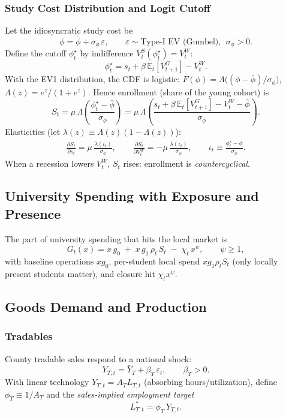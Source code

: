 \subsubsection*{Study Cost Distribution and Logit Cutoff}
Let the idiosyncratic study cost be
\[
\phi=\bar\phi + \sigma_\phi\,\varepsilon,\qquad \varepsilon\sim \text{Type-I EV (Gumbel)},\ \ \sigma_\phi>0.
\]
Define the cutoff $\phi^\star_t$ by indifference $V^S_t(\phi^\star_t)=V^W_t$:
\[
\phi^\star_t=s_t+\beta\,\mathbb{E}_t[V^G_{t+1}]-V^W_t.
\]
With the EV1 distribution, the CDF is logistic: $F(\phi)=\Lambda\big((\phi-\bar\phi)/\sigma_\phi\big)$, $\Lambda(z)=e^z/(1+e^z)$. Hence enrollment (share of the young cohort) is
\begin{equation}
	S_t=\mu\,\Lambda\!\left(\frac{\phi^\star_t-\bar\phi}{\sigma_\phi}\right)=\mu\,\Lambda\!\left(\frac{s_t+\beta\,\mathbb{E}_t[V^G_{t+1}] - V^W_t - \bar\phi}{\sigma_\phi}\right).
	\label{eq:logit_St_main}
\end{equation}
Elasticities (let $\lambda(z)\equiv \Lambda(z)(1-\Lambda(z))$):
\begin{align}
	\frac{\partial S_t}{\partial s_t}=\mu\,\frac{\lambda(\iota_t)}{\sigma_\phi},\qquad
	\frac{\partial S_t}{\partial V^W_t}=-\mu\,\frac{\lambda(\iota_t)}{\sigma_\phi},\qquad
	\iota_t\equiv\frac{\phi^\star_t-\bar\phi}{\sigma_\phi}.
	\label{eq:logit_derivs}
\end{align}
When a recession lowers $V^W_t$, $S_t$ rises: enrollment is \textit{countercyclical}.

\subsection*{University Spending with Exposure and Presence}
The part of university spending that hits the local market is
\begin{equation}
	G_t(x)=x\,g_0 \;+\; x\,g_1\,\rho_t\,S_t \;-\; \chi_t\,x^\psi,\qquad \psi\ge 1,
	\label{eq:G_def_main}
\end{equation}
with baseline operations $xg_0$, per-student local spend $xg_1\rho_t S_t$ (only locally present students matter), and closure hit $\chi_t x^\psi$.

\subsection*{Goods Demand and Production}
\subsubsection*{Tradables}
County tradable sales respond to a national shock:
\begin{equation}
	Y_{T,t}=\bar Y_T+\beta_T\,\varepsilon_t,\qquad \beta_T>0.
	\label{eq:YT_demand}
\end{equation}
With linear technology $Y_{T,t}=A_T L_{T,t}$ (absorbing hours/utilization), define $\phi_T\equiv 1/A_T$ and the \textit{sales-implied employment target}
\begin{equation}
	L_{T,t}^\ast=\phi_T\,Y_{T,t}.
	\label{eq:LT_target}
\end{equation}


